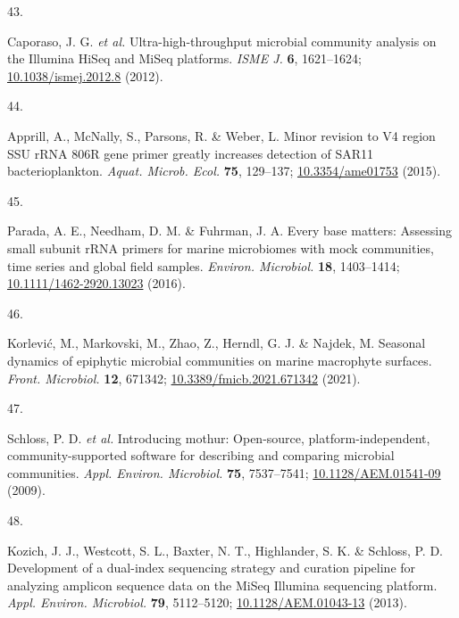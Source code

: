 \documentclass[
  12pt,
]{article}
\newlength{\cslhangindent}
\newlength{\csllabelwidth}
\newlength{\cslentryspacingunit} %
\newenvironment{CSLReferences}[2] %
 {%
  \setlength{\parindent}{0pt}
  \ifodd #1
  \let\oldpar\par
  \def\par{\hangindent=\cslhangindent\oldpar}
  \fi
  \setlength{\parskip}{#2\cslentryspacingunit}
 }%
 {}
\newcommand{\CSLLeftMargin}[1]{\parbox[t]{\csllabelwidth}{#1}}
\newcommand{\CSLRightInline}[1]{\parbox[t]{\linewidth - \csllabelwidth}{#1}\break}
\begin{document}
\begin{CSLReferences}{0}{0}
\leavevmode{}%
\CSLLeftMargin{43. }
\CSLRightInline{Caporaso, J. G. \emph{et al.} Ultra-high-throughput
microbial community analysis on the {Illumina HiSeq} and {MiSeq}
platforms. \emph{ISME J.} \textbf{6}, 1621--1624;
\href{https://doi.org/10.1038/ismej.2012.8}{10.1038/ismej.2012.8}
(2012).}

\leavevmode{}%
\CSLLeftMargin{44. }
\CSLRightInline{Apprill, A., McNally, S., Parsons, R. \& Weber, L. Minor
revision to {V4} region {SSU rRNA 806R} gene primer greatly increases
detection of {SAR11} bacterioplankton. \emph{Aquat. Microb. Ecol.}
\textbf{75}, 129--137;
\href{https://doi.org/10.3354/ame01753}{10.3354/ame01753} (2015).}

\leavevmode{}%
\CSLLeftMargin{45. }
\CSLRightInline{Parada, A. E., Needham, D. M. \& Fuhrman, J. A. Every
base matters: Assessing small subunit {rRNA} primers for marine
microbiomes with mock communities, time series and global field samples.
\emph{Environ. Microbiol.} \textbf{18}, 1403--1414;
\href{https://doi.org/10.1111/1462-2920.13023}{10.1111/1462-2920.13023}
(2016).}

\leavevmode{}%
\CSLLeftMargin{46. }
\CSLRightInline{Korlević, M., Markovski, M., Zhao, Z., Herndl, G. J. \&
Najdek, M. Seasonal dynamics of epiphytic microbial communities on
marine macrophyte surfaces. \emph{Front. Microbiol.} \textbf{12},
671342;
\href{https://doi.org/10.3389/fmicb.2021.671342}{10.3389/fmicb.2021.671342}
(2021).}

\leavevmode{}%
\CSLLeftMargin{47. }
\CSLRightInline{Schloss, P. D. \emph{et al.} Introducing mothur:
Open-source, platform-independent, community-supported software for
describing and comparing microbial communities. \emph{Appl. Environ.
Microbiol.} \textbf{75}, 7537--7541;
\href{https://doi.org/10.1128/AEM.01541-09}{10.1128/AEM.01541-09}
(2009).}

\leavevmode{}%
\CSLLeftMargin{48. }
\CSLRightInline{Kozich, J. J., Westcott, S. L., Baxter, N. T.,
Highlander, S. K. \& Schloss, P. D. Development of a dual-index
sequencing strategy and curation pipeline for analyzing amplicon
sequence data on the {MiSeq Illumina} sequencing platform. \emph{Appl.
Environ. Microbiol.} \textbf{79}, 5112--5120;
\href{https://doi.org/10.1128/AEM.01043-13}{10.1128/AEM.01043-13}
(2013).}


\end{CSLReferences}
\end{document}
